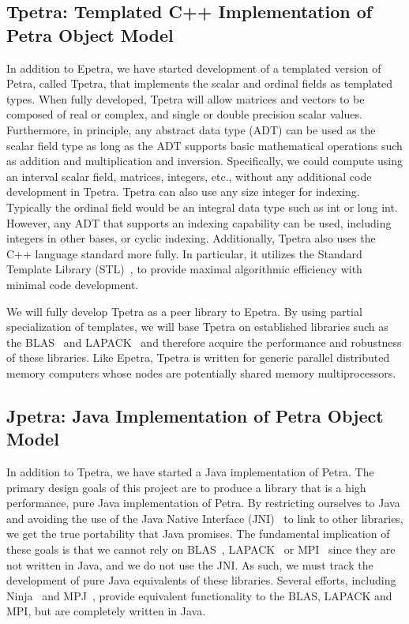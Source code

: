 \documentclass[12pt,relax]{SANDreport}
\begin{document}
\subsection{Tpetra: Templated C++ Implementation of Petra Object Model}

In addition to Epetra, we have started development of a templated version of Petra,
called Tpetra, that implements the scalar and ordinal fields as templated types.  
When fully developed, Tpetra will allow
matrices and vectors to be composed of real or complex, and single or double precision scalar
values.  Furthermore, in principle, any abstract data type (ADT) can be used as 
the scalar field type as long
as the ADT supports basic mathematical operations such as addition and multiplication and
inversion. Specifically, we could compute using an interval scalar field, matrices, integers,
etc., without any additional code development in Tpetra.  
Tpetra can also use any size integer for indexing.  Typically the ordinal field would be 
an integral data type such as int or long int.  However,
any ADT that supports an indexing capability can be used, including integers in other bases, 
or cyclic indexing. Additionally, Tpetra also
uses the C++ language standard more fully.  In particular, it utilizes the Standard
Template Library (STL)~\cite{Stroustrup}, to provide maximal
algorithmic efficiency with minimal code
development.

We will fully develop Tpetra as a peer library to Epetra. By using partial
specialization of templates, we will base Tpetra on established libraries such as the
BLAS~\cite{BLAS1,BLAS2,BLAS3} and LAPACK~\cite{lapack} and therefore acquire the
performance and robustness of these libraries.
Like Epetra, Tpetra is written for generic parallel distributed
memory computers whose nodes are
potentially shared memory multiprocessors.

\subsection{Jpetra: Java Implementation of Petra Object Model}

In addition to Tpetra, we have started a Java implementation of Petra.  The primary design
goals of this project are to produce a library that is a high performance, pure Java
implementation of Petra.  By restricting ourselves to Java and avoiding the use of the Java
Native Interface (JNI)~\cite{JNI-site} to link to other libraries, we
get the true portability that Java
promises.  The fundamental implication of these goals is that we cannot rely on
BLAS~\cite{BLAS1,BLAS2,BLAS3}, LAPACK~\cite{lapack} or MPI~\cite{MPI}
since they are not written in Java, and we do not use the JNI.
As such, we must track the development of pure Java equivalents of these libraries.  Several
efforts, including Ninja~\cite{MoreMidkGuptArtiWuAlma2001} and
MPJ~\cite{CarpGetoJuddSkjeFox2000}, provide equivalent functionality to the BLAS, LAPACK and
MPI, but are completely written in Java.
\end{document}
